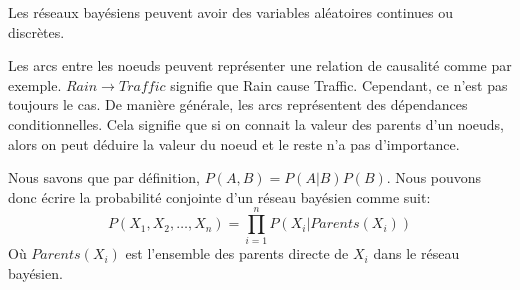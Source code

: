 \begin{example}
\begin{figure}[H]
    \end{figure}

\end{example}

\begin{note}
    Les réseaux bayésiens peuvent avoir des variables aléatoires continues ou discrètes.

    Les arcs entre les noeuds peuvent représenter une relation de causalité comme par exemple. 
    $Rain \rightarrow Traffic$ signifie que Rain cause Traffic.
    Cependant, ce n'est pas toujours le cas. De manière générale, les arcs représentent des dépendances conditionnelles. 
    Cela signifie que si on connait la valeur des parents d'un noeuds, alors on peut déduire la valeur du noeud et le reste n'a pas d'importance.
\end{note}

Nous savons que par définition, $P(A,B) = P(A|B)P(B)$.
Nous pouvons donc écrire la probabilité conjointe d'un réseau bayésien comme suit: 
\begin{equation}
    P(X_1, X_2, \dots, X_n) = \prod_{i=1}^{n} P(X_i | Parents(X_i)) 
\end{equation} 
Où $Parents(X_i)$ est l'ensemble des parents directe de $X_i$ dans le réseau bayésien.


